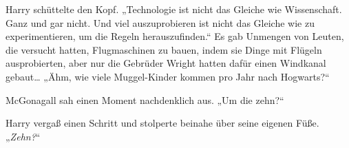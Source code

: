 Harry schüttelte den Kopf. „Technologie ist nicht das Gleiche wie Wissenschaft. Ganz und gar nicht. Und viel auszuprobieren ist nicht das Gleiche wie zu experimentieren, um die Regeln herauszufinden.“ Es gab Unmengen von Leuten, die versucht hatten, Flugmaschinen zu bauen, indem sie Dinge mit Flügeln ausprobierten, aber nur die Gebrüder Wright hatten dafür einen Windkanal gebaut… „Ähm, wie viele Muggel-Kinder kommen pro Jahr nach Hogwarts?“

McGonagall sah einen Moment nachdenklich aus. „Um die zehn?“

Harry vergaß einen Schritt und stolperte beinahe über seine eigenen Füße. „\emph{Zehn?}“

